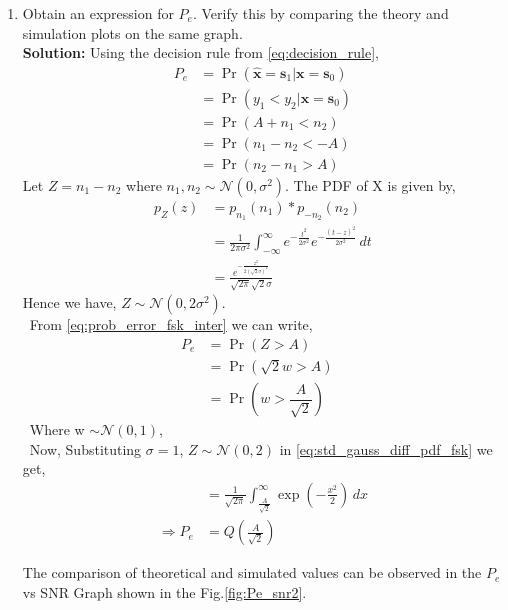 \documentclass[journal,10pt,twocolumn]{IEEEtran}
\newcounter{Chapcounter}
\numberwithin{equation}{subsection}
\numberwithin{figure}{subsection}
\renewcommand\thesection{\theChapcounter.\arabic{section}}
\providecommand{\mbf}{\mathbf}
\providecommand{\pr}[1]{\ensuremath{\Pr\left(#1\right)}}
\providecommand{\qfunc}[1]{\ensuremath{Q\left(#1\right)}}
\newcommand{\solution}{\noindent \textbf{Solution: }}
\providecommand{\gauss}[2]{\mathcal{N}\ensuremath{\left(#1,#2\right)}}
\renewcommand\thesection{\arabic{section}}
\renewcommand\thesubsection{\thesection.\arabic{subsection}}
\begin{document}
\begin{enumerate}[label=\thesubsection.\arabic*,ref=\thesubsection.\arabic{figure}]
\item
Obtain an expression for $P_e$. Verify this by comparing the theory and simulation plots on the same graph.\\
\solution Using the decision rule from \eqref{eq:decision_rule},    
	\begin{align}
P_e &= \pr{\hat{\mbf{x}} = \mbf{s}_1|\mbf{x} = \mbf{s}_0}\\\nonumber
	&= \pr{y_1 < y_2|\mbf{x} = \mbf{s}_0}\\\nonumber
	&= \pr{A+n_1 < n_2}\\
	\label{eq:prob_error_fsk_inter}
	&= \pr{n_1-n_2 < -A}\\
    &= \pr{n_2 - n_1 > A}
    \end{align}
    Let $Z = n_1-n_2$ where $n_1, n_2 \sim \gauss{0}{\sigma^2}$. The PDF of X is given by,
\begin{align}	
	p_Z(z) &= p_{n_1}(n_1) \ast p_{-n_2}(n_2)\\
	&= \frac{1}{2\pi\sigma^2}\int_{-\infty}^{\infty} e^{-\frac{t^2}{2\sigma^2}}e^{-\frac{(t-z)^2}{2\sigma^2}}  \,dt\\
	\label{eq:std_gauss_diff_pdf_fsk}
	&= \frac{e^{-\frac{z^2}{2(\sqrt{2}\sigma)^2}}}{\sqrt{2\pi}\sqrt{2}\sigma}
\end{align}    
Hence we have, $Z \sim \gauss{0}{2\sigma^2}$.\\
    \
From \eqref{eq:prob_error_fsk_inter} we can write,
    \begin{align}
     P_e &= \pr{Z > A}&\\
   &= \pr{\sqrt{2}w > A} \\
    &=  \pr{w > \dfrac{A}{\sqrt{2}}}
    \end{align}
    \
Where w $\sim \gauss{0}{1}$,\\
\
    Now, Substituting $\sigma=1$, $Z \sim \gauss{0}{2}$ in \eqref{eq:std_gauss_diff_pdf_fsk} we get,
    \begin{align}
	&= \frac{1}{\sqrt{2\pi}}\int_{\frac{A}{\sqrt{2}}}^{\infty} \exp\left(-\frac{x^2}{2}\right)  \,dx \\   
    \Rightarrow P_e &= \qfunc{\frac{A}{\sqrt{2}}}
    \end{align}
    
    The comparison of theoretical and simulated values can be observed in the $P_e$ vs SNR Graph shown in the Fig.\ref{fig:Pe_snr2}.
          
\end{enumerate}
\end{document}
